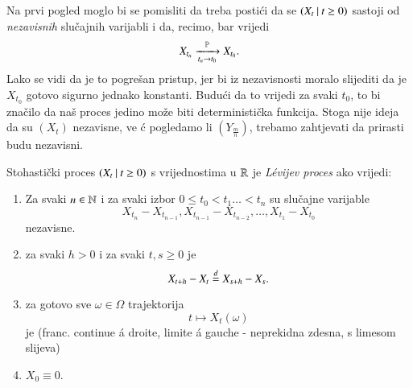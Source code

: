 \begin{nap} \label{nap:21.2}
    Na prvi pogled moglo bi se pomisliti da treba posti\' ci da se $({X_t} \: | \: {t \geq 0})$ sastoji od \emph{nezavisnih} slu\v cajnih varijabli i da, recimo, bar vrijedi
    \begin{equation*}
        X_{t_n} \xrightarrow[t_n \to t_0]{\mathbb{P}} X_{t_0}.
    \end{equation*}
    Lako se vidi da je to pogre\v san pristup, jer bi iz nezavisnosti moralo slijediti da je $X_{t_0}$ gotovo sigurno jednako konstanti.
    Budu\' ci da to vrijedi za svaki $t_0$, to bi zna\v cilo da na\v s proces jedino mo\v ze biti deterministi\v cka funkcija.
    Stoga nije ideja da su $(X_t)$ nezavisne, ve \' c pogledamo li $(Y_{\frac{m}{n}})$, trebamo zahtjevati da prirasti budu nezavisni.
\end{nap}

\begin{defn}    \label{defn:21.3}
    Stohasti\v cki proces $({X_t} \: | \: {t \geq 0})$ s vrijednostima u $\mathbb{R}$ je \emph{L\' evijev proces} ako vrijedi:
    \begin{enumerate}[label=(\alph*)]
        \item   \label{defn:21.3.1}
        Za svaki $n \in \mathbb{N}$ i za svaki izbor $0 \leq t_0 < t_1 \ldots < t_n$ su slu\v cajne varijable
        \begin{equation*}
            X_{t_n} - X_{t_{n - 1}}, X_{t_{n - 1}} - X_{t_{n - 2}}, \ldots, X_{t_1} - X_{t_0}
        \end{equation*}
        nezavisne.
        \item   \label{defn:21.3.2}
        za svaki $h > 0$ i za svaki $t, s \geq 0$ je
        \begin{equation*}
            X_{t + h} - X_t \overset{d}{=} X_{s + h} - X_s.
        \end{equation*}
        \item   \label{defn:21.3.3}
        za gotovo sve $\omega \in \Omega$ trajektorija
        \begin{equation*}
            t \mapsto X_t (\omega)
        \end{equation*}
        je \cadlag (franc. continue \' a droite, limite \' a gauche - neprekidna zdesna, s limesom slijeva)
        \item   \label{defn:21.3.4}
        $X_0 \equiv 0$.
    \end{enumerate}
\end{defn}

